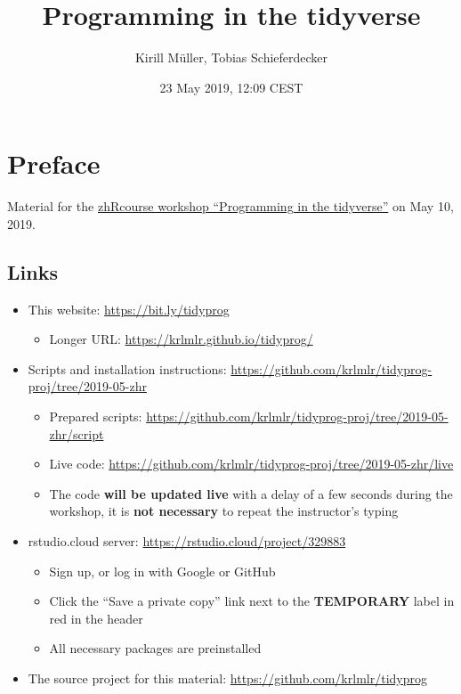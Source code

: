 \documentclass[]{book}
\title{Programming in the tidyverse}
\author{Kirill Müller, Tobias Schieferdecker}
\date{23 May 2019, 12:09 CEST}
\providecommand{\tightlist}{%
  \setlength{\itemsep}{0pt}\setlength{\parskip}{0pt}}
\begin{document}
\maketitle

{
\setcounter{tocdepth}{1}
\tableofcontents
}
\hypertarget{preface}{%
\chapter*{Preface}\label{preface}}

Material for the \href{https://www.zhrcourses.uzh.ch/en/programm2019/tidyverse.html}{zhRcourse workshop ``Programming in the tidyverse''} on May 10, 2019.

\hypertarget{links}{%
\section*{Links}\label{links}}

\begin{itemize}
\tightlist
\item
  This website: \url{https://bit.ly/tidyprog}

  \begin{itemize}
  \tightlist
  \item
    Longer URL: \url{https://krlmlr.github.io/tidyprog/}
  \end{itemize}
\item
  Scripts and installation instructions: \url{https://github.com/krlmlr/tidyprog-proj/tree/2019-05-zhr}

  \begin{itemize}
  \tightlist
  \item
    Prepared scripts: \url{https://github.com/krlmlr/tidyprog-proj/tree/2019-05-zhr/script}
  \item
    Live code: \url{https://github.com/krlmlr/tidyprog-proj/tree/2019-05-zhr/live}
  \item
    The code \textbf{will be updated live} with a delay of a few seconds during the workshop, it is \textbf{not necessary} to repeat the instructor's typing
  \end{itemize}
\item
  rstudio.cloud server: \url{https://rstudio.cloud/project/329883}

  \begin{itemize}
  \tightlist
  \item
    Sign up, or log in with Google or GitHub
  \item
    Click the ``Save a private copy'' link next to the \textbf{TEMPORARY} label in red in the header
  \item
    All necessary packages are preinstalled
  \end{itemize}
\item
  The source project for this material: \url{https://github.com/krlmlr/tidyprog}
\end{itemize}
\end{document}
